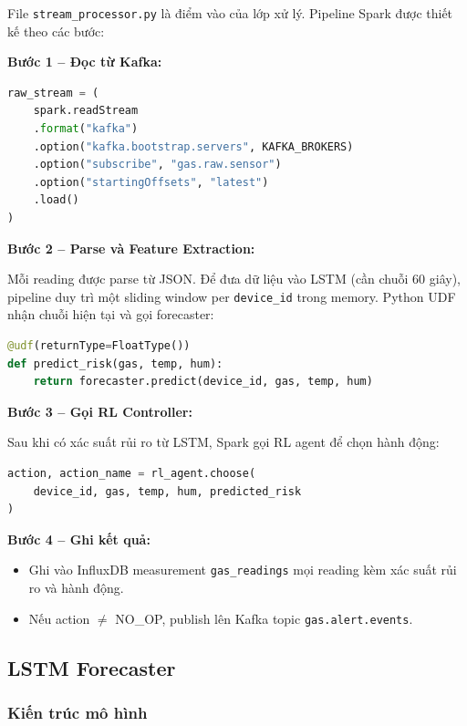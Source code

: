 File \texttt{stream\_processor.py} là điểm vào của lớp xử lý. Pipeline Spark được thiết kế theo các bước:

\textbf{Bước 1 – Đọc từ Kafka:}
\begin{lstlisting}[language=Python, caption={Đọc stream từ Kafka}]
raw_stream = (
    spark.readStream
    .format("kafka")
    .option("kafka.bootstrap.servers", KAFKA_BROKERS)
    .option("subscribe", "gas.raw.sensor")
    .option("startingOffsets", "latest")
    .load()
)
\end{lstlisting}

\textbf{Bước 2 – Parse và Feature Extraction:}

Mỗi reading được parse từ JSON. Để đưa dữ liệu vào LSTM (cần chuỗi 60 giây), pipeline duy trì một sliding window per \texttt{device\_id} trong memory. Python UDF nhận chuỗi hiện tại và gọi forecaster:

\begin{lstlisting}[language=Python, caption={Gọi LSTM forecaster trong Spark}]
@udf(returnType=FloatType())
def predict_risk(gas, temp, hum):
    return forecaster.predict(device_id, gas, temp, hum)
\end{lstlisting}

\textbf{Bước 3 – Gọi RL Controller:}

Sau khi có xác suất rủi ro từ LSTM, Spark gọi RL agent để chọn hành động:
\begin{lstlisting}[language=Python, caption={Gọi RL agent}]
action, action_name = rl_agent.choose(
    device_id, gas, temp, hum, predicted_risk
)
\end{lstlisting}

\textbf{Bước 4 – Ghi kết quả:}
\begin{itemize}
  \item Ghi vào InfluxDB measurement \texttt{gas\_readings} mọi reading kèm xác suất rủi ro và hành động.
  \item Nếu action $\neq$ NO\_OP, publish lên Kafka topic \texttt{gas.alert.events}.
\end{itemize}

\subsection{LSTM Forecaster}

\subsubsection{Kiến trúc mô hình}

